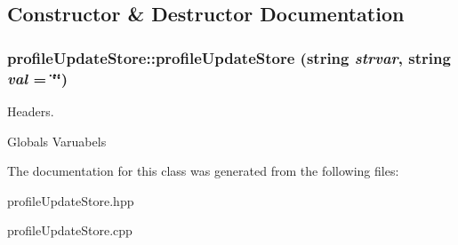 \subsection{Constructor \& Destructor Documentation}
\hypertarget{classprofileUpdateStore_a9befa25c24c51e242860b4460a08a6d0}{
\subsubsection[{profileUpdateStore}]{\setlength{\rightskip}{0pt plus 5cm}profileUpdateStore::profileUpdateStore (string {\em strvar}, \/  string {\em val} = {\ttfamily \char`\"{}\char`\"{}})}}
\label{classprofileUpdateStore_a9befa25c24c51e242860b4460a08a6d0}


Headers. 

Globals Varuabels 

The documentation for this class was generated from the following files:\begin{DoxyCompactItemize}
\item 
profileUpdateStore.hpp\item 
profileUpdateStore.cpp\end{DoxyCompactItemize}
